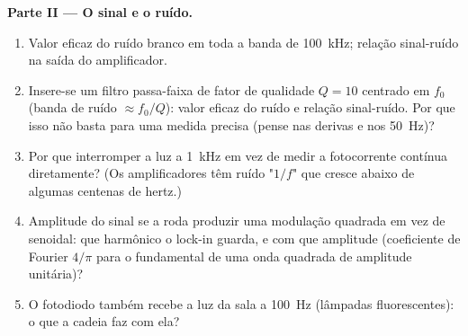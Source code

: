 \begin{problem}
\medskip
\noindent\textbf{Parte II --- O sinal e o ruído.}
\begin{enumerate}[resume]
  \item Valor eficaz do ruído branco em toda a banda de \qty{100}{kHz};
        relação sinal-ruído na saída do amplificador.
  \item Insere-se um filtro passa-faixa de fator de qualidade $Q = 10$ centrado em $f_0$
        (banda de ruído $\approx f_0/Q$): valor eficaz do ruído e relação sinal-ruído.
        Por que isso não basta para uma medida precisa (pense nas
        derivas e nos \qty{50}{Hz})?
  \item Por que interromper a luz a \qty{1}{kHz} em vez de medir a
        fotocorrente contínua diretamente? (Os amplificadores têm ruído "$1/f$" que cresce
        abaixo de algumas centenas de hertz.)
  \item Amplitude do sinal se a roda produzir uma modulação quadrada
        em vez de senoidal: que harmônico o lock-in
        guarda, e com que amplitude (coeficiente de Fourier $4/\pi$ para o
        fundamental de uma onda quadrada de amplitude unitária)?
  \item O fotodiodo também recebe a luz da sala a \qty{100}{Hz}
        (lâmpadas fluorescentes): o que a cadeia faz com ela?
\end{enumerate}


\end{problem}
